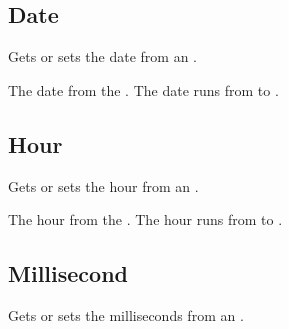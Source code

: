 \documentclass[letterpaper,12pt,english,openany,oneside]{sphinxmanual}
\begin{document}
\subsection{Date}
\label{\detokenize{IAC_API_OLE_Objects:date}}
Gets or sets the date from an .


\begin{sphinxVerbatim}[commandchars=\\\{\}]
\PYG{p}{[}\PYG{p}{]} 
\end{sphinxVerbatim}


The date from the . The date runs from  to .




\subsection{Hour}
\label{\detokenize{IAC_API_OLE_Objects:hour}}
Gets or sets the hour from an .


\begin{sphinxVerbatim}[commandchars=\\\{\}]
\PYG{p}{[}\PYG{p}{]} 
\end{sphinxVerbatim}


The hour from the . The hour runs from  to .




\subsection{Millisecond}
\label{\detokenize{IAC_API_OLE_Objects:millisecond}}
Gets or sets the milliseconds from an .


\begin{sphinxVerbatim}[commandchars=\\\{\}]
\PYG{p}{[}\PYG{p}{]} 
\end{sphinxVerbatim}
\end{document}

